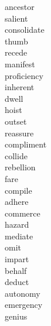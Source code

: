 \documentclass[a4paper, 10pt]{ctexart}
\begin{document}
\begin{multicols*}{2}
\begin{description}
\item[ancestor]

\item[salient]

\item[consolidate]

\item[thumb]

\item[recede]

\item[manifest]

\item[proficiency]

\item[inherent]

\item[dwell]

\item[hoist]

\item[outset]

\item[reassure]

\item[compliment]

\item[collide]

\item[rebellion]

\item[fare]

\item[compile]

\item[adhere]

\item[commerce]

\item[hazard]

\item[mediate]

\item[omit]

\item[impart]

\item[behalf]

\item[deduct]

\item[autonomy]

\item[emergency]

\item[genius]


\end{description}
\end{multicols*}
\end{document}

